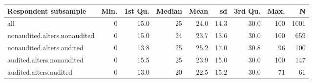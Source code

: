 \begin{table}[ht]
\centering
\begin{tabular}{lrrrrrrrr}
  \hline
Respondent subsample & Min. & 1st Qu. & Median & Mean & sd & 3rd Qu. & Max. & N \\ 
  \hline
all &  0 & 15.0 & 25 & 24.0 & 14.3 & 30.0 & 100 & 1001 \\ 
  nonaudited.alters.nonaudited &  0 & 15.0 & 24 & 23.7 & 13.6 & 30.0 & 100 & 659 \\ 
  nonaudited.alters.audited &  0 & 13.8 & 25 & 25.2 & 17.0 & 30.8 & 96 & 100 \\ 
  audited.alters.nonaudited &  0 & 15.5 & 25 & 23.9 & 15.0 & 30.0 & 100 & 147 \\ 
  audited.alters.audited &  0 & 13.0 & 20 & 22.5 & 15.2 & 30.0 & 71 & 61 \\ 
   \hline
\end{tabular}
\end{table}
